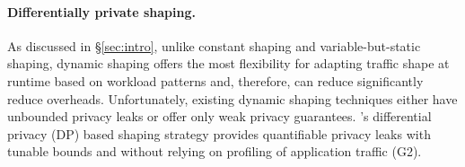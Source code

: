 \paragraph{Differentially private shaping.}

As discussed in \S\ref{sec:intro}, unlike constant shaping and
variable-but-static shaping, dynamic shaping offers the most flexibility for
adapting traffic shape at runtime based on workload patterns and, therefore, can
reduce significantly reduce overheads.
{Unfortunately, existing dynamic shaping techniques either have unbounded privacy
leaks or offer only weak privacy guarantees.
}
%
{\sys}'s  differential privacy (DP) based shaping strategy provides
quantifiable privacy leaks with tunable bounds and without relying on profiling
of application traffic (G2).
%

